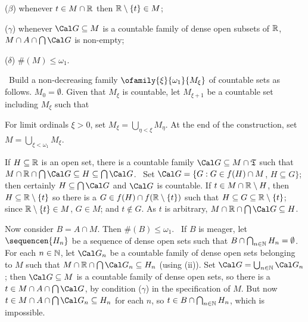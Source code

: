 {{($\beta$) whenever $t\in M\cap\Bbb R$ then $\Bbb R\setminus\{t\}\in M$;

($\gamma$) whenever $\Cal G\subseteq M$ is a countable family of dense
open subsets of $\Bbb R$, $M\cap A\cap\bigcap\Cal G$ is non-empty;

($\delta$) $\#(M)\le\omega_1$.}

\noindent\Prf\ Build a non-decreasing family
$\ofamily{\xi}{\omega_1}{M_{\xi}}$ of countable sets as follows.
$M_0=\emptyset$.   Given that $M_{\xi}$ is countable, let $M_{\xi+1}$
be a countable set including $M_{\xi}$ such that


\noindent For limit ordinals $\xi>0$, set
$M_{\xi}=\bigcup_{\eta<\xi}M_{\eta}$.   At the end of the construction,
set $M=\bigcup_{\xi<\omega_1}M_{\xi}$.\ \Qed

\medskip

 If $H\subseteq\Bbb R$ is an open set, there is a
countable family $\Cal G\subseteq M\cap\frak T$ such that
$M\cap\Bbb R\cap\bigcap\Cal G\subseteq H\subseteq\bigcap\Cal G$.   \Prf\
Set $\Cal G=\{G:G\in f(H)\cap M$, $H\subseteq G\}$;  then certainly
$H\subseteq\bigcap\Cal G$ and $\Cal G$ is countable.   If
$t\in M\cap\Bbb R\setminus H$, then $H\subseteq\Bbb R\setminus\{t\}$ so
there is a $G\in f(H)\cap f(\Bbb R\setminus\{t\})$ such that
$H\subseteq G\subseteq\Bbb R\setminus\{t\}$;  since
$\Bbb R\setminus\{t\}\in M$,
$G\in M$;  and $t\notin G$.   As $t$ is arbitrary,
$M\cap\Bbb R\cap\bigcap\Cal G\subseteq H$.\ \Qed

\medskip

 Now consider $B=A\cap M$.   Then $\#(B)\le\omega_1$.
\Quer\ If $B$ is meager, let $\sequencen{H_n}$ be a sequence of dense
open sets such that $B\cap\bigcap_{n\in\Bbb N}H_n=\emptyset$.   For each
$n\in\Bbb N$, let $\Cal G_n$ be a countable family of dense open sets
belonging to $M$ such that
$M\cap\Bbb R\cap\bigcap\Cal G_n\subseteq H_n$ (using (ii)).   Set
$\Cal G=\bigcup_{n\in\Bbb N}\Cal G_n$;  then $\Cal G\subseteq M$ is a
countable family of dense open sets, so there is a
$t\in M\cap A\cap\bigcap\Cal G$, by condition ($\gamma$) in the
specification of $M$.   But now
$t\in M\cap A\cap\bigcap\Cal G_n\subseteq H_n$ for each $n$, so
$t\in B\cap\bigcap_{n\in\Bbb N}H_n$, which is impossible.\ \Bang

}
